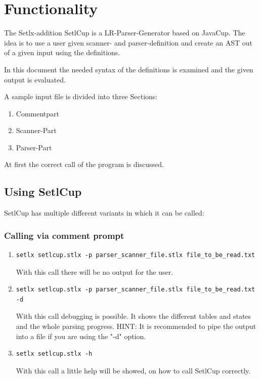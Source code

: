 \chapter{Functionality}

The Setlx-addition SetlCup is a LR-Parser-Generator based on JavaCup.
The idea is to use a user given scanner- and parser-definition and create an AST out of a given input using the definitions.

In this document the needed syntax of the definitions is examined and the given output is evaluated.

A sample input file is divided into three Sections:
\begin{enumerate}
	\item Commentpart
	\item Scanner-Part
	\item Parser-Part
\end{enumerate}

At first the correct call of the program is discussed.
\section{Using SetlCup}
SetlCup has multiple different variants in which it can be called:
\subsection{Calling via comment prompt}
\begin{enumerate}
	\item \begin{verbatim}setlx setlcup.stlx -p parser_scanner_file.stlx file_to_be_read.txt \end{verbatim}
			With this call there will be no output for the user.
	\item \begin{verbatim}setlx setlcup.stlx -p parser_scanner_file.stlx file_to_be_read.txt -d\end{verbatim}
			With this call debugging is possible. It shows the different tables and states and the whole parsing progress. HINT: It is recommended to pipe the output into a file if you are using the "-d" option.
	\item \begin{verbatim}setlx setlcup.stlx -h\end{verbatim}
			With this call a little help will be showed, on how to call SetlCup correctly.
\end{enumerate}
